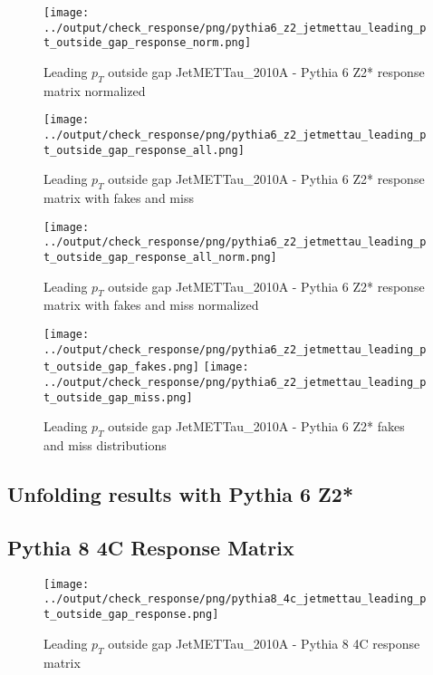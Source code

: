 \documentclass[11pt]{book}
\begin{document}
\begin{figure}[ht]
\centering
\texttt{[image: ../output/check\_response/png/pythia6\_z2\_jetmettau\_leading\_pt\_outside\_gap\_response\_norm.png]}
\caption{Leading $p_{T}$ outside gap JetMETTau\_2010A - Pythia 6 Z2* response matrix normalized}
\label{p6_jetmettau_leading_pt_outside_gap_response_norm}
\end{figure}

\begin{figure}[ht]
\centering
\texttt{[image: ../output/check\_response/png/pythia6\_z2\_jetmettau\_leading\_pt\_outside\_gap\_response\_all.png]}
\caption{Leading $p_{T}$ outside gap JetMETTau\_2010A - Pythia 6 Z2* response matrix with fakes and miss}
\label{p6_jetmettau_leading_pt_outside_gap_response_all}
\end{figure}

\begin{figure}[ht]
\centering
\texttt{[image: ../output/check\_response/png/pythia6\_z2\_jetmettau\_leading\_pt\_outside\_gap\_response\_all\_norm.png]}
\caption{Leading $p_{T}$ outside gap JetMETTau\_2010A - Pythia 6 Z2* response matrix with fakes and miss normalized}
\label{p6_jetmettau_leading_pt_outside_gap_response_all_norm}
\end{figure}

\begin{figure}[ht]
\centering
\texttt{[image: ../output/check\_response/png/pythia6\_z2\_jetmettau\_leading\_pt\_outside\_gap\_fakes.png]}
\texttt{[image: ../output/check\_response/png/pythia6\_z2\_jetmettau\_leading\_pt\_outside\_gap\_miss.png]}
\caption{Leading $p_{T}$ outside gap JetMETTau\_2010A - Pythia 6 Z2* fakes and miss distributions}
\label{p6_jetmettau_leading_pt_outside_gap_fakesmiss}
\end{figure}


\clearpage
\subsection{Unfolding results with Pythia 6 Z2*}


\clearpage
\subsection{Pythia 8 4C Response Matrix}


\begin{figure}[ht]
\centering
\texttt{[image: ../output/check\_response/png/pythia8\_4c\_jetmettau\_leading\_pt\_outside\_gap\_response.png]}
\caption{Leading $p_{T}$ outside gap JetMETTau\_2010A - Pythia 8 4C response matrix}
\label{p8_jetmettau_leading_pt_outside_gap_response}
\end{figure}
\end{document}

